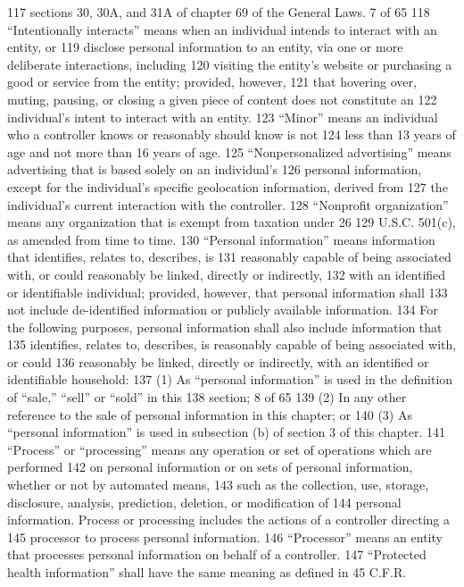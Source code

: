117 sections 30, 30A, and 31A of chapter 69 of the General Laws.
7 of 65
118 “Intentionally interacts” means when an individual intends to interact with an entity, or
119 disclose personal information to an entity, via one or more deliberate interactions, including
120 visiting the entity’s website or purchasing a good or service from the entity; provided, however,
121 that hovering over, muting, pausing, or closing a given piece of content does not constitute an
122 individual’s intent to interact with an entity.
123 “Minor” means an individual who a controller knows or reasonably should know is not
124 less than 13 years of age and not more than 16 years of age.
125 “Nonpersonalized advertising” means advertising that is based solely on an individual’s
126 personal information, except for the individual’s specific geolocation information, derived from
127 the individual’s current interaction with the controller.
128 “Nonprofit organization” means any organization that is exempt from taxation under 26
129 U.S.C. 501(c), as amended from time to time.
130 “Personal information” means information that identifies, relates to, describes, is
131 reasonably capable of being associated with, or could reasonably be linked, directly or indirectly,
132 with an identified or identifiable individual; provided, however, that personal information shall
133 not include de-identified information or publicly available information.
134 For the following purposes, personal information shall also include information that
135 identifies, relates to, describes, is reasonably capable of being associated with, or could
136 reasonably be linked, directly or indirectly, with an identified or identifiable household:
137 (1) As “personal information” is used in the definition of “sale,” “sell” or “sold” in this
138 section;
8 of 65
139 (2) In any other reference to the sale of personal information in this chapter; or
140 (3) As “personal information” is used in subsection (b) of section 3 of this chapter.
141 “Process” or “processing” means any operation or set of operations which are performed
142 on personal information or on sets of personal information, whether or not by automated means,
143 such as the collection, use, storage, disclosure, analysis, prediction, deletion, or modification of
144 personal information. Process or processing includes the actions of a controller directing a
145 processor to process personal information.
146 “Processor” means an entity that processes personal information on behalf of a controller.
147 “Protected health information” shall have the same meaning as defined in 45 C.F.R.
